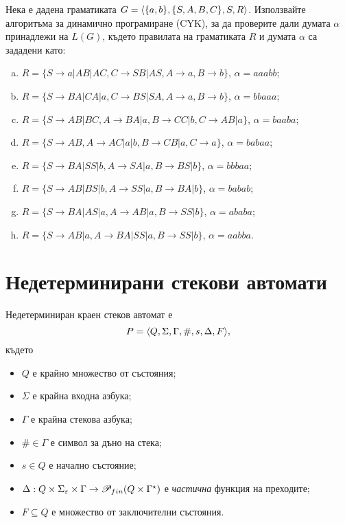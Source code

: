 \begin{problem}
  Нека е дадена граматиката $G = \langle{\{a,b\}, \{S,A,B,C\},S,R}\rangle$.
  Използвайте алгоритъма за динамично програмиране (CYK), за да проверите дали
  думата $\alpha$ принадлежи на $L(G)$, където правилата на граматиката $R$ и думата $\alpha$
  са зададени като:
  \begin{enumerate}[a)]
  \item
    $R =\{S\rightarrow a| AB|AC, C\rightarrow SB|AS,A\rightarrow a, B\rightarrow b\}$, $\alpha=aaabb$;
  \item
    $R = \{S\rightarrow BA| CA|a, C\rightarrow BS|SA,A\rightarrow a, B\rightarrow b\}$, $\alpha=bbaaa$;
  \item
    $R =\{S\rightarrow AB|BC, A\rightarrow BA|a,B\rightarrow CC|b, C\rightarrow AB|a\}$, $\alpha=baaba$;
  \item
    $R = \{S\rightarrow AB, A\rightarrow AC|a|b,B\rightarrow CB|a, C\rightarrow a\}$, $\alpha=babaa$;
  \item
    $R = \{S\rightarrow BA|SS|b, A\rightarrow SA|a,B\rightarrow BS|b\}$, $\alpha = bbbaa$;
  \item
    $R = \{S\rightarrow AB| BS|b, A\rightarrow SS|a,B\rightarrow BA|b\}$, $\alpha = babab$;
  \item
    $R = \{S\rightarrow BA| AS|a, A\rightarrow AB|a,B\rightarrow SS|b\}$, $\alpha = ababa$;
  \item
    $R = \{S\rightarrow AB|a, A\rightarrow BA|SS|a,B\rightarrow SS|b\}$, $\alpha = aabba$.
  \end{enumerate}
\end{problem}


\section{Недетерминирани стекови автомати}

\begin{dfn}
  Недетерминиран краен стеков автомат е \[P = \langle{Q,\Sigma,\Gamma,\#,s,\Delta,F}\rangle,\] където 
  \begin{itemize}
  \item
    $Q$ е крайно множество от състояния;
  \item  
    $\Sigma$ е крайна входна азбука;
  \item
    $\Gamma$ е крайна стекова азбука;
  \item
    $\# \in \Gamma$ е символ за дъно на стека;
  \item
    $s\in Q$ е начално състояние;
  \item
    $\Delta:Q\times\Sigma_\varepsilon\times\Gamma\rightarrow \mathscr{P}_{fin}(Q\times\Gamma^\star)$ 
    е {\em частична} функция на преходите;    
  \item
    $F\subseteq Q$ е множество от заключителни състояния.
  \end{itemize}
\end{dfn}

